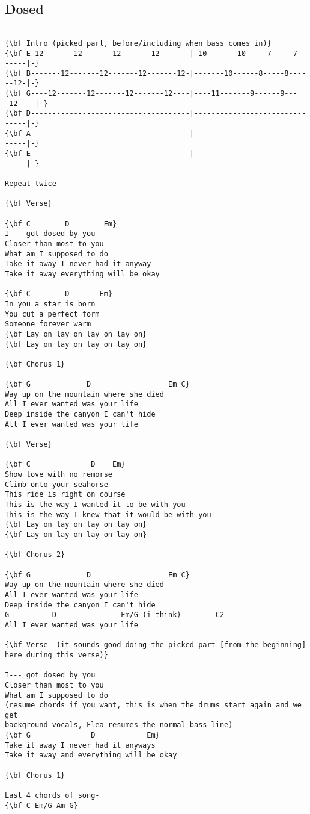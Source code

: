 \documentclass[a4paper]{article}
\begin{document}
\subsection{Dosed}
\begin{Verbatim}[commandchars=\\\{\}]

{\bf Intro (picked part, before/including when bass comes in)}
{\bf E-12-------12-------12-------12-------|-10-------10-----7-----7-------|-}
{\bf B-------12-------12-------12-------12-|-------10------8-----8------12-|-}
{\bf G----12-------12-------12-------12----|----11-------9------9----12----|-}
{\bf D-------------------------------------|-------------------------------|-}
{\bf A-------------------------------------|-------------------------------|-}
{\bf E-------------------------------------|-------------------------------|-}

Repeat twice

{\bf Verse}

{\bf C        D        Em}
I--- got dosed by you
Closer than most to you
What am I supposed to do
Take it away I never had it anyway
Take it away everything will be okay

{\bf C        D       Em}
In you a star is born
You cut a perfect form
Someone forever warm
{\bf Lay on lay on lay on lay on}
{\bf Lay on lay on lay on lay on}

{\bf Chorus 1}

{\bf G             D                  Em C}
Way up on the mountain where she died
All I ever wanted was your life
Deep inside the canyon I can't hide
All I ever wanted was your life

{\bf Verse}

{\bf C              D    Em}
Show love with no remorse
Climb onto your seahorse
This ride is right on course
This is the way I wanted it to be with you
This is the way I knew that it would be with you
{\bf Lay on lay on lay on lay on}
{\bf Lay on lay on lay on lay on}

{\bf Chorus 2}

{\bf G             D                  Em C}
Way up on the mountain where she died
All I ever wanted was your life
Deep inside the canyon I can't hide
G          D               Em/G (i think) ------ C2
All I ever wanted was your life

{\bf Verse- (it sounds good doing the picked part [from the beginning] here during this verse)}

I--- got dosed by you
Closer than most to you
What am I supposed to do
(resume chords if you want, this is when the drums start again and we get
background vocals, Flea resumes the normal bass line)
{\bf G              D            Em}
Take it away I never had it anyways
Take it away and everything will be okay

{\bf Chorus 1}

Last 4 chords of song-
{\bf C Em/G Am G}

\end{Verbatim}
\newpage
\end{document}
